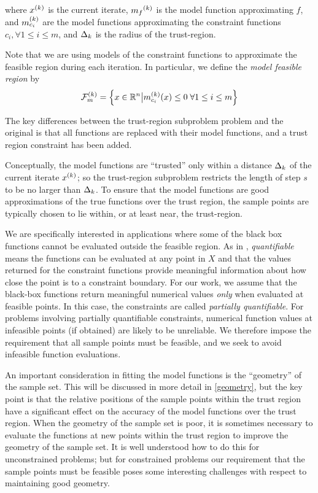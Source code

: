 where $x^{(k)}$ is the current iterate, ${{m}_f}^{(k)}$ is the model function approximating $f$, 
and ${{m}^{(k)}_{c_i}}$ are the model functions approximating the constraint functions $c_i, \forall 1 \le i \le m$, and $\Delta_k$ is the radius of the trust-region.

Note that we are using models of the constraint functions to approximate the feasible region during each iteration.  In particular, we define the {\em model feasible region} by
\begin{align}
{\mathcal F_m^{(k)}} = \left\{x \in \mathbb R^n \big| {{m}^{(k)}_{c_i}}(x) \le 0 \; \forall 1 \le i \le m \right\} 
\end{align}

The key differences between the trust-region subproblem problem and the original is that all functions are replaced with their model functions, and a trust region constraint has been added.

Conceptually, the model functions are ``trusted'' only within a distance $ \Delta_k $ of the current iterate $x^{(k)}$; so the trust-region subproblem restricts the length of step $s$ to be no larger than $\Delta_k$.
To ensure that the model functions are good approximations of the true functions over the trust region, the sample points are typically chosen to lie within, or at least near, the trust-region.

We are specifically interested in applications where some of the black box functions cannot be evaluated outside the feasible region.      As in \cite{digabel2015taxonomy}, {\em quantifiable} means the functions can be evaluated at any point in $X$ and that the values returned for the constraint functions provide meaningful information about how close the point is to a constraint boundary.
For our work, we assume that the black-box functions return meaningful numerical values \emph{only} when evaluated at feasible points.    In this case,  the constraints are called {\em partially quantifiable}.    
For problems involving partially quantifiable constraints,  numerical function values at infeasible points (if obtained) are likely to be unreliable.   We therefore impose 
 the requirement that all sample points must be feasible, and we seek to avoid infeasible function evaluations.

An important consideration in fitting the model functions is the ``geometry'' of the sample set.
This will be discussed in more detail in \cref{geometry}, but the key point is that the relative positions of the sample points within the trust region have a significant effect on the accuracy of the model functions over the trust region.
When the geometry of the sample set is poor, it is sometimes necessary to evaluate the functions at new points within the trust region to improve the geometry of the sample set.
It is well understood how to do this for unconstrained problems; but for constrained problems
our
requirement that the sample points must be feasible  poses some interesting challenges with respect to maintaining good geometry.   

